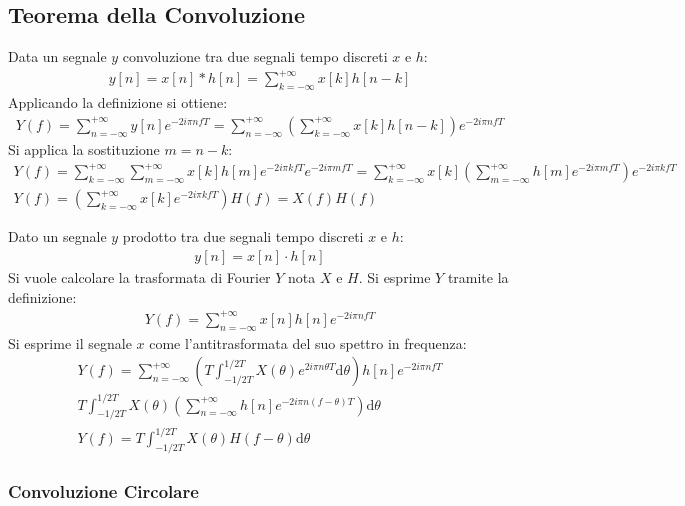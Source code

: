 \documentclass{article}
\newcommand{\df}{\mathrm{d}}
\numberwithin{equation}{subsection}
\begin{document}
\subsection{Teorema della Convoluzione}

Data un segnale $y$ convoluzione tra due segnali tempo discreti $x$ e $h$:
\begin{gather*}
    y[n]=x[n]*h[n]=\displaystyle\sum_{k=-\infty}^{+\infty}x[k]h[n-k]
\end{gather*}
Applicando la definizione si ottiene:
\begin{gather*}
    Y(f)=\displaystyle\sum_{n=-\infty}^{+\infty}y[n]e^{-2i\pi nfT}=\displaystyle\sum_{n=-\infty}^{+\infty}\left(\sum_{k=-\infty}^{+\infty}x[k]h[n-k]\right)e^{-2i\pi nfT}
\end{gather*}
Si applica la sostituzione $m=n-k$:
\begin{gather*}
    Y(f)=\displaystyle\sum_{k=-\infty}^{+\infty}\sum_{m=-\infty}^{+\infty}x[k]h[m]e^{-2i\pi kfT}e^{-2i\pi mfT}=\sum_{k=-\infty}^{+\infty}x[k]\left(\sum_{m=-\infty}^{+\infty}h[m]e^{-2i\pi mfT}\right)e^{-2i\pi kfT}\\
    Y(f)=\displaystyle\left(\sum_{k=-\infty}^{+\infty}x[k]e^{-2i\pi kfT}\right)H(f)=X(f)H(f)
\end{gather*}

Dato un segnale $y$ prodotto tra due segnali tempo discreti $x$ e $h$:
\begin{gather*}
    y[n]=x[n]\cdot h[n]
\end{gather*}
Si vuole calcolare la trasformata di Fourier $Y$ nota $X$ e $H$. Si esprime $Y$ tramite la definizione:
\begin{gather*}
    Y(f)=\displaystyle\sum_{n=-\infty}^{+\infty}x[n]h[n]e^{-2i\pi nfT}
\end{gather*}
Si esprime il segnale $x$ come l'antitrasformata del suo spettro in frequenza: 
\begin{gather*}
    Y(f)=\displaystyle\sum_{n=-\infty}^{+\infty}\left(T\int_{-1/2T}^{1/2T}X(\theta)e^{2i\pi n\theta T}\df\theta\right)h[n]e^{-2i\pi nfT}\\
    T\int_{-1/2T}^{1/2T}X(\theta)\left(\sum_{n=-\infty}^{+\infty}h[n]e^{-2i\pi n(f-\theta)T}\right)\df\theta\\
    Y(f)=\displaystyle T\int_{-1/2T}^{1/2T}X(\theta)H(f-\theta)\df\theta
\end{gather*}

\subsubsection{Convoluzione Circolare}
\end{document}
